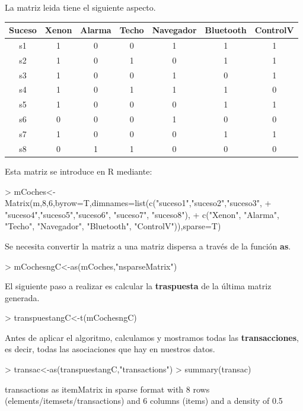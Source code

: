 \documentclass [a4paper] {article}
\begin{document}
{\bigskip
La matriz leida tiene el siguiente aspecto.
\begin{table}[H]
\begin{center}
\begin{tabular}{|c|c|c|c|c|c|c|}
\hline
Suceso & Xenon & Alarma & Techo & Navegador & Bluetooth & ControlV \\
\hline \hline
s1 & 1 & 0 & 0 & 1 & 1 & 1 \\ \hline
s2 & 1 & 0 & 1 & 0 & 1 & 1 \\ \hline
s3 & 1 & 0 & 0 & 1 & 0 & 1 \\ \hline
s4 & 1 & 0 & 1 & 1 & 1 & 0 \\ \hline
s5 & 1 & 0 & 0 & 0 & 1 & 1 \\ \hline
s6 & 0 & 0 & 0 & 1 & 0 & 0 \\ \hline
s7 & 1 & 0 & 0 & 0 & 1 & 1 \\ \hline
s8 & 0 & 1 & 1 & 0 & 0 & 0 \\ \hline
\end{tabular}
\end{center}
\end{table}

\bigskip
Esta matriz se introduce en R mediante:
\begin{Schunk}
\begin{Sinput}
> mCoches<-Matrix(m,8,6,byrow=T,dimnames=list(c("suceso1","suceso2","suceso3",
+ "suceso4","suceso5","suceso6", "suceso7", "suceso8"),
+ c("Xenon", "Alarma", "Techo", "Navegador", "Bluetooth", "ControlV")),sparse=T)
\end{Sinput}
\end{Schunk}

\bigskip
Se necesita convertir la matriz a una matriz dispersa a través de la función \textbf{as}.
\begin{Schunk}
\begin{Sinput}
> mCochesngC<-as(mCoches,"nsparseMatrix")
\end{Sinput}
\end{Schunk}

\bigskip
El siguiente paso a realizar es calcular la \textbf{traspuesta} de la última matriz generada.
\begin{Schunk}
\begin{Sinput}
> transpuestangC<-t(mCochesngC)
\end{Sinput}
\end{Schunk}

\bigskip
Antes de aplicar el algoritmo, calculamos y mostramos todas las \textbf{transacciones}, es decir, todas las asociaciones
que hay en nuestros datos.
\begin{Schunk}
\begin{Sinput}
> transac<-as(transpuestangC,"transactions")
> summary(transac)
\end{Sinput}
\begin{Soutput}
transactions as itemMatrix in sparse format with
 8 rows (elements/itemsets/transactions) and
 6 columns (items) and a density of 0.5 


\end{Soutput}
\end{Schunk}}
\end{document}
